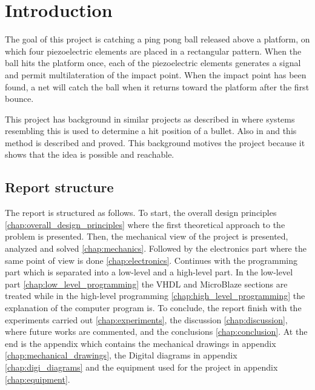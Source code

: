 \chapter{Introduction}
\label{chap:introduction}
		The goal of this project is catching a ping pong ball released above a platform, on which four piezoelectric elements are placed in a rectangular pattern.
		When the ball hits the platform once, each of the piezoelectric elements generates a signal and permit multilateration of the impact point. When the impact point has been found, a net will catch the ball when it returns toward the platform after the first bounce.

		This project has background in similar projects as described in \cite{electronic_target} where systems resembling this is used to determine a hit position of a bullet. Also in \cite{tdoa_book} and \cite{tdoa_notes} this method is described and proved. This background motives the project because it shows that the idea is possible and reachable.
	\section{Report structure}
	\label{sec:reportStructure}
		The report is structured as follows. To start, the overall design principles \ref{chap:overall_design_principles} where the first theoretical approach to the problem is presented.
		Then, the mechanical view of the project is presented, analyzed and solved \ref{chap:mechanics}.
		Followed by the electronics part where the same point of view is done \ref{chap:electronics}.
		Continues with the programming part which is separated into a low-level and a high-level part.
		In the low-level part \ref{chap:low_level_programming} the VHDL and MicroBlaze sections are treated while in the high-level programming \ref{chap:high_level_programming} the explanation of the computer program is.
		To conclude, the report finish with the experiments carried out \ref{chap:experiments}, the discussion \ref{chap:discussion}, where future works are commented, and the conclusions \ref{chap:conclusion}.
		At the end is the appendix which contains the mechanical drawings in appendix \ref{chap:mechanical_drawings}, the Digital diagrams in appendix \ref{chap:digi_diagrams} and the equipment used for the project in appendix \ref{chap:equipment}.